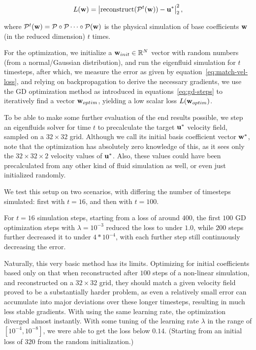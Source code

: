 \begin{equation}\label{eq:match-vel-loss}
  L(\vb{w}) = \left|
  \text{reconstruct}(\mathcal{P}^{t}(\vb{w})) - \vb{u}^*
  \right|_2^2,
\end{equation}

where $\mathcal{P}^t(\vb{w}) = \mathcal{P} \circ \mathcal{P} \dots \circ
\mathcal{P}(\vb{w})$ is the physical simulation of base coefficients $\vb{w}$
(in the reduced dimension) $t$ times.

For the optimization, we initialize a $\vb{w}_{init} \in \mathbb{R}^N$
vector with random numbers (from a normal/Gaussian distribution), and run the
eigenfluid simulation for $t$ timesteps, after which, we measure the error as
given by equation~\eqref{eq:match-vel-loss}, and relying on backpropagation to
derive the necessary gradients, we use the \ac{GD} optimization method as
introduced in equations~\eqref{eq:gd-steps} to iteratively find a vector
$\vb{w}_{optim}$, yielding a low scalar loss $L(\vb{w}_{optim})$.

To be able to make some further evaluation of the end results possible, we step
an eigenfluids solver for time $t$ to precalculate the target $\vb{u}^*$
velocity field, sampled on a $32\times32$ grid. Although we call its initial
basis coefficient vector $\vb{w}^*$, note that the optimization has absolutely
zero knowledge of this, as it sees only the $32\times32\times2$ velocity values
of $\vb{u}^*$. Also, these values could have been precalculated from any other
kind of fluid simulation as well, or even just initialized randomly.

We test this setup on two scenarios, with differing the number of timesteps
simulated: first with $t=16$, and then with $t=100$.

For $t=16$ simulation steps, starting from a loss of around $400$, the first
$100$ \ac{GD} optimization steps with $\lambda=10^{-3}$ reduced the loss to
under $1.0$, while $200$ steps further decreased it to under $4*10^{-4}$, with
each further step still continuously decreasing the error. 

Naturally, this very basic method has its limits.  Optimizing for initial
coefficients based only on that when reconstructed after $100$ steps of
a non-linear simulation, and reconstructed on a $32\times32$ grid, they should
match a given velocity field proved to be a substantially harder problem, as
even a relatively small error can accumulate into major deviations over these
longer timesteps, resulting in much less stable gradients.  With using the same
learning rate, the optimization diverged almost instantly. With some tuning of
the learning rate $\lambda$ in the range of $[10^{-4}, 10^{-8}]$, we were able
to get the loss below $0.14$. (Starting from an initial loss of $320$ from the
random initialization.) 

